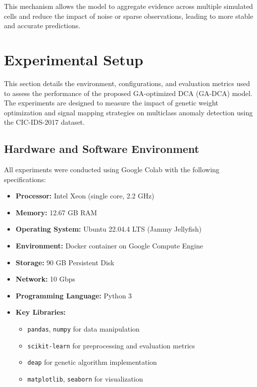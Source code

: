 \documentclass[conference]{IEEEtran}
\begin{document}
This mechanism allows the model to aggregate evidence across multiple
simulated cells and reduce the impact of noise or sparse
observations, leading to more stable and accurate predictions.

\section{Experimental Setup}

This section details the environment, configurations, and evaluation
metrics used to assess the performance of the proposed GA-optimized
DCA (GA-DCA) model. The experiments are designed to measure the
impact of genetic weight optimization and signal mapping strategies
on multiclass anomaly detection using the CIC-IDS-2017 dataset.

\subsection{Hardware and Software Environment}

All experiments were conducted using Google Colab with the following specifications:

\begin{itemize}
  \item \textbf{Processor:} Intel Xeon (single core, 2.2 GHz)
  \item \textbf{Memory:} 12.67 GB RAM
  \item \textbf{Operating System:} Ubuntu 22.04.4 LTS (Jammy Jellyfish)
  \item \textbf{Environment:} Docker container on Google Compute Engine
  \item \textbf{Storage:} 90 GB Persistent Disk
  \item \textbf{Network:} 10 Gbps
  \item \textbf{Programming Language:} Python 3
  \item \textbf{Key Libraries:}
    \begin{itemize}
      \item \texttt{pandas}, \texttt{numpy} for data manipulation
      \item \texttt{scikit-learn} for preprocessing and evaluation metrics
      \item \texttt{deap} for genetic algorithm implementation
      \item \texttt{matplotlib}, \texttt{seaborn} for visualization
    \end{itemize}
\end{itemize}
\end{document}
